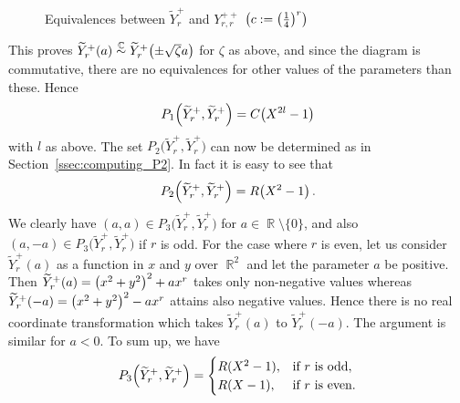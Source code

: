 \documentclass[noend]{amsproc}
\theoremstyle{definition}
\let\originalleft\left
\let\originalright\right
\renewcommand{\left}{\mathopen{}\mathclose\bgroup\originalleft}
\renewcommand{\right}{\aftergroup\egroup\originalright}
\newcommand{\tY}{\widetilde{Y}}
\DeclareMathOperator{\R}{\mathbb{R}}
\DeclareMathOperator{\C}{\mathbb{C}}
\newcommand{\csim}{\ensuremath{\mathrel{%
  \raisebox{0pt}[\heightof{$\overset{\scriptscriptstyle\C}{\sim}$}]{%
    $\overset{\C}{\sim}$%
  }%
}}}
\begin{document}
\begin{figure}
\caption{Equivalences between $\tY_r^+$ and $Y_{r,r}^{++}$%
\quad$\left(c := \left(\frac{1}{4}\right)^r\right)$}%
\label{fig:Yr}
\end{figure}

This proves $\tY_r^+(a) \csim \tY_r^+\left(\pm \sqrt{\zeta}a\right)$ for
$\zeta$ as above, and since the diagram is commutative, there are no
equivalences for other values of the parameters than these. Hence
\[
P_1\left(\tY_r^+, \tY_r^+\right) = C\left(X^{2l}-1\right)
\]
with $l$ as above. The set $P_2\bigl(\tY_r^+, \tY_r^+\bigr)$ can now be
determined as in Section~\ref{ssec:computing_P2}. In fact it is easy to see
that
\[
P_2\left(\tY_r^+, \tY_r^+\right) = R\left(X^2-1\right) \,.
\]
We clearly have $(a, a) \in P_3\bigl(\tY_r^+, \tY_r^+\bigr)$ for
$a \in \R \setminus \{0\}$, and also
$(a, -a) \in P_3\bigl(\tY_r^+, \tY_r^+\bigr)$ if $r$ is odd. For the case where
$r$ is even, let us
consider $\tY_r^+(a)$ as a function in $x$ and $y$ over $\R^2$ and let the
parameter $a$ be positive. Then $\tY_r^+(a) = \left(x^2+y^2\right)^2+ax^r$
takes only non-negative values whereas
$\tY_r^+(-a) = \left(x^2+y^2\right)^2-ax^r$ attains also negative values. Hence
there is no real coordinate transformation which takes $\tY_r^+(a)$ to
$\tY_r^+(-a)$. The argument is similar for $a < 0$. To sum up, we have
\[
P_3\left(\tY_r^+, \tY_r^+\right) =
\begin{cases}
R(X^2-1), &\text{if } r \text{ is odd}, \\
R(X-1),   &\text{if } r \text{ is even}.
\end{cases}
\]
\end{document}
